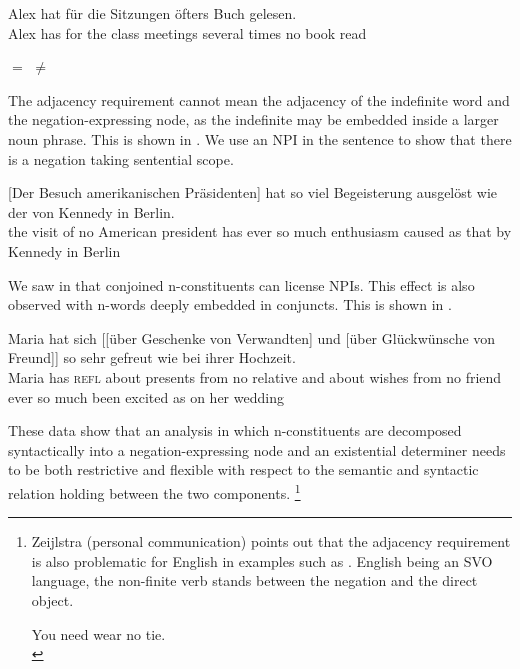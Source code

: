 \documentclass[output=paper]{langsci/langscibook}
\begin{document}
\ea \label{often-homework} 
\gll Alex hat für die Sitzungen öfters  Buch gelesen.\\
Alex has for the {class meetings} {several times} no {book} read\\
\begin{xlist} 
\ex 
$=$ \label{oefters-nicht}
\ex 
$\not=$ \label{nicht-oefters}
\end{xlist}
\z 


The adjacency requirement cannot mean the adjacency of the indefinite word and the negation-expressing node, as the indefinite may be embedded inside a larger noun phrase. 
This is shown in . 
We use an NPI in the sentence to show that there is a negation taking sentential scope.

\ea \label{kennedy}
\gll {}[Der Besuch  amerikanischen Präsidenten] hat  so viel Begeisterung ausgelöst wie der von Kennedy in Berlin.\\
\hphantom{[}the visit {of no} American president has ever so much enthusiasm caused as {that} by Kennedy in Berlin\\
\glt {}
\z 

We saw in  that conjoined n-constituents can license NPIs. This effect is also observed with n-words deeply embedded in conjuncts. This is shown in . 

\ea \label{cnnp-kennedy}
\gll Maria hat sich [[über  Geschenke von  Verwandten] und [über Glückwünsche von  Freund]]  so sehr gefreut wie bei ihrer Hochzeit.\\
Maria has \textsc{refl} \hphantom{[[}about presents from no relative and about wishes from no friend ever so much {been excited} as on her wedding\\
\glt {}
\z 

These data show that 
an analysis in which n-constituents are decomposed syntactically into a negation-expressing node and an existential determiner
needs to be both restrictive and flexible with respect to the semantic and syntactic relation holding between the 
two components.%
\footnote{Zeijlstra (personal communication) points out that the adjacency requirement is also problematic for English in examples such as . English being an SVO language, the non-finite verb stands between the negation and the direct object.

\ea \label{no-tie}
You need wear no tie.\\
\z}\largerpage
\end{document}
